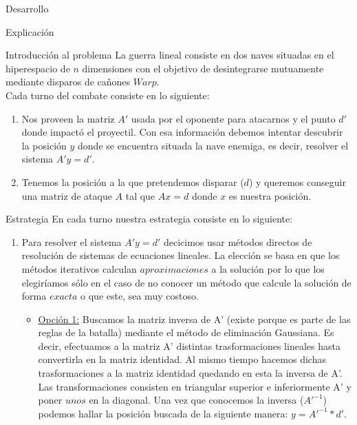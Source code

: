 \begin{section}{Desarrollo}
	\begin{subsection}{Explicación}
		\begin{subsubsection}{Introducción al problema}
			La guerra lineal consiste en dos naves situadas en el hiperespacio de $n$ dimensiones con el objetivo de desintegrarse mutuamente mediante disparos de cañones $Warp$.\\
			
			Cada turno del combate consiste en lo siguiente:
			\begin{enumerate}
			\item Nos proveen la matriz $A'$ usada por el oponente para atacarnos y el punto $d'$ donde impactó el proyectil. Con esa información debemos intentar descubrir la posición $y$ donde se encuentra situada la nave enemiga, es decir, resolver el sistema $A'y=d'$.
					
			\item Tenemos la posición a la que pretendemos disparar ($d$) y queremos conseguir una matriz de ataque $A$ tal que $Ax=d$ donde $x$ es nuestra posición.
			\end{enumerate}
		\end{subsubsection}
		\begin{subsubsection}{Estrategia}
			En cada turno nuestra estrategia consiste en lo siguiente:
			
			\begin{enumerate}
			\item Para resolver el sistema $A'y=d'$ decicimos usar métodos directos de resolución de sistemas de ecuaciones lineales. La elección se basa en que los métodos iterativos calculan $aproximaciones$ a la solución por lo que los elegiríamos sólo en el caso de no conocer un método que calcule la solución de forma $exacta$ o que este, sea muy costoso.
				\begin{itemize}
					\item \underline{Opción 1:} Buscamos la matriz inversa de A' (existe porque es parte de las reglas de la batalla) mediante el método de eliminación Gaussiana. Es decir, efectuamos a la matriz A' distintas trasformaciones lineales hasta convertirla en la matriz identidad. Al mismo tiempo hacemos dichas trasformaciones a la matriz identidad quedando en esta la inversa de A'.
					Las transformaciones consisten en triangular superior e inferiormente A' y poner $unos$ en la diagonal.
					Una vez que conocemos la inversa ($A'^{-1}$) podemos hallar la posición buscada de la siguiente manera: $y=A'^{-1}*d'$.\\
					

\end{itemize}
\end{enumerate}
\end{subsubsection}
\end{subsection}
\end{section}
